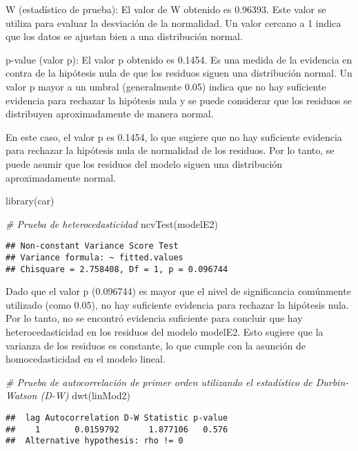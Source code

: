 \documentclass[
]{article}
\newenvironment{Shaded}{\begin{snugshade}}{\end{snugshade}}
\newcommand{\CommentTok}[1]{\textcolor[rgb]{0.56,0.35,0.01}{\textit{#1}}}
\newcommand{\FunctionTok}[1]{\textcolor[rgb]{0.00,0.00,0.00}{#1}}
\newcommand{\NormalTok}[1]{#1}
\begin{document}
W (estadístico de prueba): El valor de W obtenido es 0.96393. Este valor
se utiliza para evaluar la desviación de la normalidad. Un valor cercano
a 1 indica que los datos se ajustan bien a una distribución normal.

p-value (valor p): El valor p obtenido es 0.1454. Es una medida de la
evidencia en contra de la hipótesis nula de que los residuos siguen una
distribución normal. Un valor p mayor a un umbral (generalmente 0.05)
indica que no hay suficiente evidencia para rechazar la hipótesis nula y
se puede considerar que los residuos se distribuyen aproximadamente de
manera normal.

En este caso, el valor p es 0.1454, lo que sugiere que no hay suficiente
evidencia para rechazar la hipótesis nula de normalidad de los residuos.
Por lo tanto, se puede asumir que los residuos del modelo siguen una
distribución aproximadamente normal.

\begin{Shaded}
\begin{Highlighting}[]
\FunctionTok{library}\NormalTok{(car)}

\CommentTok{\# Prueba de heterocedasticidad }
\FunctionTok{ncvTest}\NormalTok{(modelE2)}
\end{Highlighting}
\end{Shaded}

\begin{verbatim}
## Non-constant Variance Score Test 
## Variance formula: ~ fitted.values 
## Chisquare = 2.758408, Df = 1, p = 0.096744
\end{verbatim}

Dado que el valor p (0.096744) es mayor que el nivel de significancia
comúnmente utilizado (como 0.05), no hay suficiente evidencia para
rechazar la hipótesis nula. Por lo tanto, no se encontró evidencia
suficiente para concluir que hay heterocedasticidad en los residuos del
modelo modelE2. Esto sugiere que la varianza de los residuos es
constante, lo que cumple con la asunción de homocedasticidad en el
modelo lineal.

\begin{Shaded}
\begin{Highlighting}[]
\CommentTok{\#  Prueba de autocorrelación de primer orden utilizando el estadístico de Durbin{-}Watson (D{-}W)}
\FunctionTok{dwt}\NormalTok{(linMod2)}
\end{Highlighting}
\end{Shaded}

\begin{verbatim}
##  lag Autocorrelation D-W Statistic p-value
##    1       0.0159792      1.877106   0.576
##  Alternative hypothesis: rho != 0
\end{verbatim}
\end{document}
